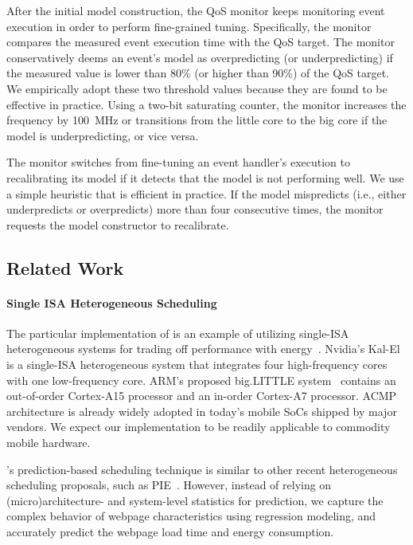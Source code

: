 After the initial model construction, the QoS monitor keeps monitoring event execution in order to perform fine-grained tuning. Specifically, the monitor compares the measured event execution time with the QoS target. The monitor conservatively deems an event's model as overpredicting (or underpredicting) if the measured value is lower than 80\% (or higher than 90\%) of the QoS target. We empirically adopt these two threshold values because they are found to be effective in practice. Using a two-bit saturating counter, the monitor increases the frequency by 100~MHz or transitions from the little core to the big core if the model is underpredicting, or vice versa.

The monitor switches from fine-tuning an event handler's execution to recalibrating its model if it detects that the model is not performing well. We use a simple heuristic that is efficient in practice. If the model mispredicts (i.e., either underpredicts or overpredicts) more than four consecutive times, the monitor requests the model constructor to recalibrate.

\subsection{Related Work}
\label{sec:runtime:related}

\paragraph{Single ISA Heterogeneous Scheduling} The particular implementation of \webrt is an example of utilizing single-ISA heterogeneous systems for trading off performance with energy~\cite{single-ISA}. Nvidia's Kal-El~\cite{Tegra3} is a single-ISA heterogeneous system that integrates four high-frequency cores with one low-frequency core. ARM's proposed big.LITTLE system~\cite{big.little} contains an out-of-order Cortex-A15 processor and an in-order Cortex-A7 processor. ACMP architecture is already widely adopted in today's mobile SoCs shipped by major vendors. We expect our \webrt implementation to be readily applicable to commodity mobile hardware.

\webrt's prediction-based scheduling technique is similar to other recent heterogeneous scheduling proposals, such as PIE~\cite{PIE}. However, instead of relying on (micro)architecture- and system-level statistics for prediction, we capture the complex behavior of webpage characteristics using regression modeling, and accurately predict the webpage load time and energy consumption.

